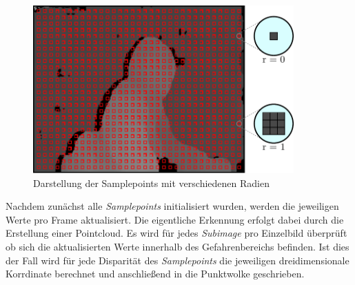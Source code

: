 \begin{figure}[h]
	\begin{center}
		\includegraphics[width=10cm]{img/samplepoints_initmodes.pdf}
	\end{center}
	\caption{Darstellung der Samplepoints mit verschiedenen Radien}
	\label{fig:samplepoints_initmodes}
\end{figure}

\noindent
Nachdem zunächst alle \emph{Samplepoints} initialisiert wurden, werden die jeweiligen Werte pro Frame aktualisiert. Die eigentliche Erkennung erfolgt dabei durch die Erstellung einer Pointcloud. Es wird für jedes \emph{Subimage} pro Einzelbild überprüft ob sich die aktualisierten Werte innerhalb des Gefahrenbereichs befinden. Ist dies der Fall wird für jede Disparität des \emph{Samplepoints} die jeweiligen dreidimensionale Korrdinate berechnet und anschließend in die Punktwolke geschrieben.
